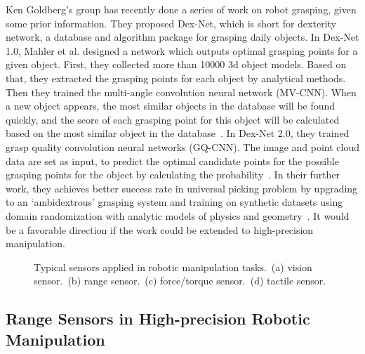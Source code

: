 \documentclass[journal,twoside,web]{ieeecolor}
\begin{document}
Ken Goldberg's group has recently done a series of work on robot grasping, given some prior information. 
They proposed Dex-Net, which is short for dexterity network, a database and algorithm package for grasping daily objects.
In Dex-Net 1.0, Mahler et al. designed a network which outputs optimal grasping points for a given object. 
First, they collected more than 10000 3d object models. Based on that, they extracted the grasping points for each object by analytical methods. Then they trained the multi-angle convolution neural network (MV-CNN). When a new object appears, the most similar objects in the database will be found quickly, and the score of each grasping point for this object will be calculated based on the most similar object in the database~\cite{Mahler2016}.
In Dex-Net 2.0, they trained grasp quality convolution neural networks (GQ-CNN). The image and point cloud data are set as input, to predict the optimal candidate points for the possible grasping points for the object by calculating the probability~\cite{Mahler2017a}.
In their further work, they achieves better success rate in universal picking problem by upgrading to an `ambidextrous' grasping system and training on synthetic datasets using domain randomization with analytic models of physics and geometry~\cite{Mahler2018,Mahler2019}. It would be a favorable direction if the work could be extended to high-precision manipulation.

\begin{figure}
    \centering
    {
        \hfil
        \hfil
        \hfil		
    }
    \caption{Typical sensors applied in robotic manipulation tasks.~(a) vision sensor.~(b) range sensor.~(c) force/torque sensor.~(d) tactile sensor.}
    \label{fig:sensors}
\end{figure}

\subsection{Range Sensors in High-precision Robotic Manipulation}
\label{subsec:range_sensor}
\end{document}
